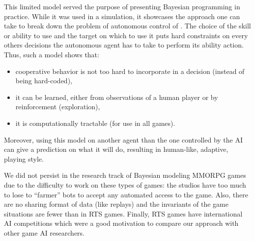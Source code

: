 This limited model served the purpose of presenting Bayesian programming in practice. While it was used in a simulation, it showcases the approach one can take to break down the problem of autonomous control of . The choice of the skill or ability to use and the target on which to use it puts hard constraints on every others decisions the autonomous agent has to take to perform its ability action. Thus, such a model shows that:
\begin{itemize}
    \item cooperative behavior is not too hard to incorporate in a decision (instead of being hard-coded),
    \item it can be learned, either from observations of a human player or by reinforcement (exploration),
    \item it is computationally tractable (for use in all games).%
\end{itemize}
Moreover, using this model on another agent than the one controlled by the AI can give a prediction on what it will do, resulting in human-like, adaptive, playing style.

We did not persist in the research track of Bayesian modeling MMORPG games due to the difficulty to work on these types of games: the studios have too much to lose to ``farmer'' bots to accept any automated access to the game. Also, there are no sharing format of data (like replays) and the invariants of the game situations are fewer than in RTS games. Finally, RTS games have international AI competitions which were a good motivation to compare our approach with other game AI researchers.
